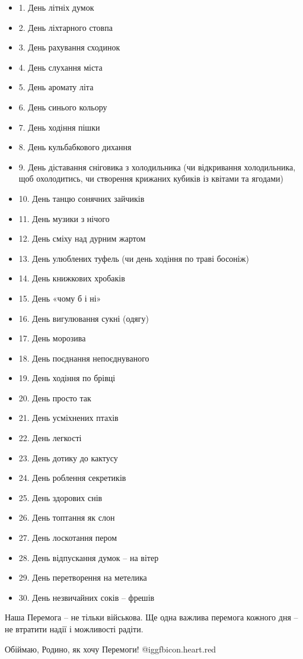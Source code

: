 \begin{itemize}
  \item 1. День літніх думок
  \item 2. День ліхтарного стовпа
  \item 3. День рахування сходинок
  \item 4. День слухання міста
  \item 5. День аромату літа
  \item 6. День синього кольору
  \item 7. День ходіння пішки
  \item 8. День кульбабкового дихання
  \item 9. День діставання сніговика з холодильника (чи відкривання холодильника, щоб охолодитись, чи створення крижаних кубиків із квітами та ягодами)
  \item 10. День танцю сонячних зайчиків
  \item 11. День музики з нічого
  \item 12. День сміху над дурним жартом
  \item 13. День улюблених туфель (чи день ходіння по траві босоніж)
  \item 14. День книжкових хробаків
  \item 15. День «чому б і ні»
  \item 16. День вигулювання сукні (одягу)
  \item 17. День морозива
  \item 18. День поєднання непоєднуваного
  \item 19. День ходіння по брівці
  \item 20. День просто так
  \item 21. День усміхнених птахів
  \item 22. День легкості
  \item 23. День дотику до кактусу
  \item 24. День роблення секретиків
  \item 25. День здорових снів
  \item 26. День топтання як слон
  \item 27. День лоскотання пером
  \item 28. День відпускання думок – на вітер
  \item 29. День перетворення на метелика
  \item 30. День незвичайних соків – фрешів
\end{itemize}

Наша Перемога – не тільки військова. Ще одна важлива перемога кожного дня – не
втратити надії і можливості радіти. 

Обіймаю, Родино, як хочу Перемоги! @igg{fbicon.heart.red}

